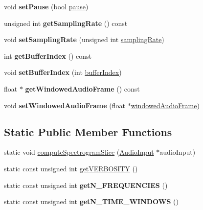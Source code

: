 \begin{DoxyCompactItemize}
void {\bfseries set\+Pause} (bool \mbox{\hyperlink{classAudioInput_a3ff41f73529f77872f6ab585d7cf706a}{pause}})
\item 
\mbox{\label{classAudioInput_a19c4e0c35b8360b0dca9cf5cad3d2e64}} 
unsigned int {\bfseries get\+Sampling\+Rate} () const
\item 
\mbox{\label{classAudioInput_a621a6d87ca463668289f2cb7fa97c75c}} 
void {\bfseries set\+Sampling\+Rate} (unsigned int \mbox{\hyperlink{classAudioInput_acfe371c4f5790bd67d282bc83225728e}{sampling\+Rate}})
\item 
\mbox{\label{classAudioInput_a78df439ada22ba00be19c4c8a82bbe3d}} 
int {\bfseries get\+Buffer\+Index} () const
\item 
\mbox{\label{classAudioInput_a506d7f5eec641d0232286ea145270038}} 
void {\bfseries set\+Buffer\+Index} (int \mbox{\hyperlink{classAudioInput_a3c9888a90ca8bc6b42257f3f11ee9a6e}{buffer\+Index}})
\item 
\mbox{\label{classAudioInput_a4de4a846fe48603932495acaafc54449}} 
float $\ast$ {\bfseries get\+Windowed\+Audio\+Frame} () const
\item 
\mbox{\label{classAudioInput_a8e7dd67ab635c3935bd54f72a5282dce}} 
void {\bfseries set\+Windowed\+Audio\+Frame} (float $\ast$\mbox{\hyperlink{classAudioInput_ae5a196a9ba111b7aa1ef64db6f092432}{windowed\+Audio\+Frame}})
\end{DoxyCompactItemize}
\subsection*{Static Public Member Functions}
\begin{DoxyCompactItemize}
\item 
static void \mbox{\hyperlink{classAudioInput_a77614769e39be88bbf5d78adf84d9260}{compute\+Spectrogram\+Slice}} (\mbox{\hyperlink{classAudioInput}{Audio\+Input}} $\ast$audio\+Input)
\item 
static const unsigned int \mbox{\hyperlink{classAudioInput_a76a26e018987d0a303a32852ebf85254}{get\+V\+E\+R\+B\+O\+S\+I\+TY}} ()
\item 
\mbox{\label{classAudioInput_ae73b1fc55b3247b431d27bb673318dde}} 
static const unsigned int {\bfseries get\+N\+\_\+\+F\+R\+E\+Q\+U\+E\+N\+C\+I\+ES} ()
\item 
\mbox{\label{classAudioInput_a6e33130e47360bad95cfeb094f079334}} 
static const unsigned int {\bfseries get\+N\+\_\+\+T\+I\+M\+E\+\_\+\+W\+I\+N\+D\+O\+WS} ()
\end{DoxyCompactItemize}
